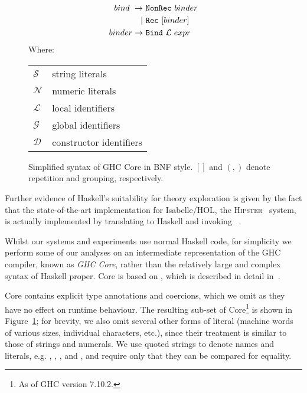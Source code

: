 \begin{figure}
\begin{equation*}
\begin{split}
      bind\    \rightarrow\ & \texttt{NonRec}\ binder                   \\
                         |\ & \texttt{Rec}\ [binder]                    \\
      binder   \rightarrow\ & \texttt{Bind}\ \mathcal{L}\ expr
    \end{split}
  \end{equation*}
  Where:
  \begin{tabular}[t]{l @{ $=$ } l}
    $\mathcal{S}$ & string literals    \\
    $\mathcal{N}$ & numeric literals   \\
    $\mathcal{L}$ & local identifiers  \\
    $\mathcal{G}$ & global identifiers \\
    $\mathcal{D}$ & constructor identifiers
  \end{tabular}

  \caption{Simplified syntax of GHC Core in BNF style. $[]$ and $(,)$ denote repetition and grouping, respectively.}
  \label{fig:coresyntax}
\end{figure}

Further evidence of Haskell's suitability for theory exploration is given by the
fact that the state-of-the-art implementation for Isabelle/HOL, the
\textsc{Hipster}~\cite{Hipster} system, is actually implemented by translating
to Haskell and invoking \hspec{}~\cite{claessen2013automating}.

Whilst our systems and experiments use normal Haskell code, for simplicity we
perform some of our analyses on an intermediate representation of the
\textsc{GHC} compiler, known as \emph{GHC Core}, rather than the relatively
large and complex syntax of Haskell proper. Core is based on \fc{}, which is
described in detail in~\cite[Appendix C]{sulzmann2007system}.

Core contains explicit type annotations and coercions, which we omit as they
have no effect on runtime behaviour. The resulting sub-set of Core\footnote{As
  of GHC version 7.10.2.} is shown in Figure~\ref{fig:coresyntax}; for brevity,
we also omit several other forms of literal (machine words of various sizes,
individual characters, etc.), since their treatment is similar to those of
strings and numerals. We use quoted strings to denote names and literals,
e.g. , , ,  and , and require only that they can be compared for
equality.

